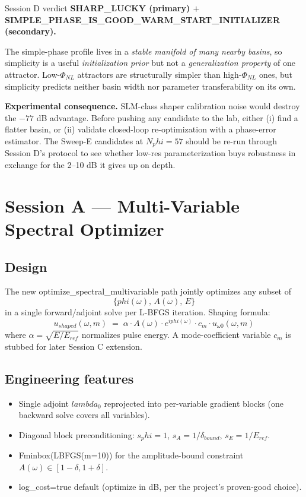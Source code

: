 \documentclass[11pt,letterpaper]{article}
\def\varphi{phi}%
\def\mathrm#1{#1}%
\def\lambda{lambda}%
\def\texttt#1{#1}%
\begin{document}
\begin{verdict}{Session D verdict}
\textbf{SHARP\_LUCKY (primary) $+$ SIMPLE\_PHASE\_IS\_GOOD\_WARM\_START\_INITIALIZER (secondary).}

The simple-phase profile lives in a \emph{stable manifold of many nearby basins}, so simplicity is a useful \emph{initialization prior} but not a \emph{generalization property} of one attractor. Low-$\Phi_{\mathrm{NL}}$ attractors are structurally simpler than high-$\Phi_{\mathrm{NL}}$ ones, but simplicity predicts neither basin width nor parameter transferability on its own.

\textbf{Experimental consequence.} SLM-class shaper calibration noise would destroy the $-77$ dB advantage. Before pushing any candidate to the lab, either (i) find a flatter basin, or (ii) validate closed-loop re-optimization with a phase-error estimator. The Sweep-E candidates at $\mathrm{N}_\varphi = 57$ should be re-run through Session D's protocol to see whether low-res parameterization buys robustness in exchange for the 2--10 dB it gives up on depth.
\end{verdict}

\newpage
\section{Session A --- Multi-Variable Spectral Optimizer}
\label{sec:sessionA}

\subsection{Design}

The new \texttt{optimize\_spectral\_multivariable} path jointly optimizes any subset of
\[
  \{\varphi(\omega),\, A(\omega),\, E\}
\]
in a single forward/adjoint solve per L-BFGS iteration. Shaping formula:
\[
  u_{\mathrm{shaped}}(\omega, m) \;=\; \alpha \cdot A(\omega) \cdot e^{i\varphi(\omega)} \cdot c_m \cdot u_{\omega 0}(\omega, m)
\]
where $\alpha = \sqrt{E / E_{\mathrm{ref}}}$ normalizes pulse energy. A mode-coefficient variable $c_m$ is stubbed for later Session C extension.

\subsection{Engineering features}

\begin{itemize}[leftmargin=*]
  \item Single adjoint $\lambda_0$ reprojected into per-variable gradient blocks (one backward solve covers all variables).
  \item Diagonal block preconditioning: $s_\varphi = 1$, $s_A = 1/\delta_{\mathrm{bound}}$, $s_E = 1/E_{\mathrm{ref}}$.
  \item \texttt{Fminbox(LBFGS(m=10))} for the amplitude-bound constraint $A(\omega) \in [1 - \delta, 1 + \delta]$.
  \item \texttt{log\_cost=true} default (optimize in dB, per the project's proven-good choice).
\end{itemize}
\end{document}
